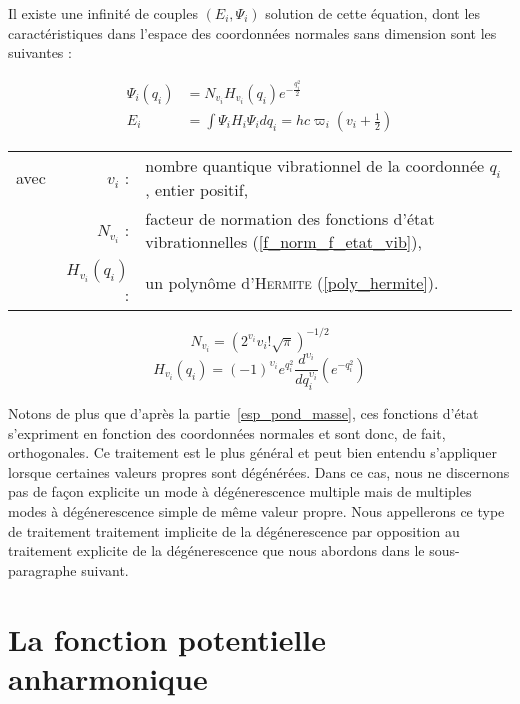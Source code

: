 \documentclass[12pt,a4paper]{book}
\begin{document}
Il existe une infinité de couples $(E_i, \Psi_i)$ solution de cette équation, dont les caractéristiques dans l'espace des coordonnées normales sans dimension sont les suivantes :

\begin{align}
\Psi_i\left(q_i\right) &= N_{v_i} H_{v_i} \left(q_i\right) e^{-\frac{q^2_i}{2}} \\
E_i &= \int \Psi_i H_i \Psi_i dq_i = hc \varpi_i\left(v_i + \frac{1}{2}\right)
\end{align}
\begin{tabular}{@{}lrp{14cm}}
	avec & $v_i$ : & nombre quantique vibrationnel de la coordonnée $q_i$, entier positif,\\
	& $N_{v_i}$ : & facteur de normation des fonctions d'état vibrationnelles (\ref{f_norm_f_etat_vib}),\\
	& $H_{v_i}(q_i)$ : & un polynôme d'\textsc{Hermite} (\ref{poly_hermite}).\\
\end{tabular}


\begin{equation}
N_{v_i} = \left(2^{v_i} v_i ! \sqrt{\pi} \right)^{-1/2}
\label{f_norm_f_etat_vib}
\end{equation}
\begin{equation}
H_{v_i}(q_i) = (-1)^{\upsilon_i} e^{q_{i}^{2}} \frac{d^{\upsilon_i}}{dq_{i}^{\upsilon_i}} \left(e^{-q_{i}^{2}} \right)
\label{poly_hermite}
\end{equation}

Notons de plus que d'après la partie~\ref{esp_pond_masse}, ces fonctions d'état s'expriment en fonction des coordonnées normales et sont donc, de fait, orthogonales.
Ce traitement est le plus général et peut bien entendu s'appliquer lorsque certaines valeurs propres sont dégénérées. Dans ce cas, nous ne discernons pas de façon explicite un mode à dégénerescence multiple mais de multiples modes à dégénerescence simple de même valeur propre. Nous appellerons ce type de traitement \og traitement implicite de la dégénerescence \fg{} par opposition au \og traitement explicite de la dégénerescence \fg{} que nous abordons dans le sous-paragraphe suivant.




\section{La fonction potentielle anharmonique}
\end{document}
